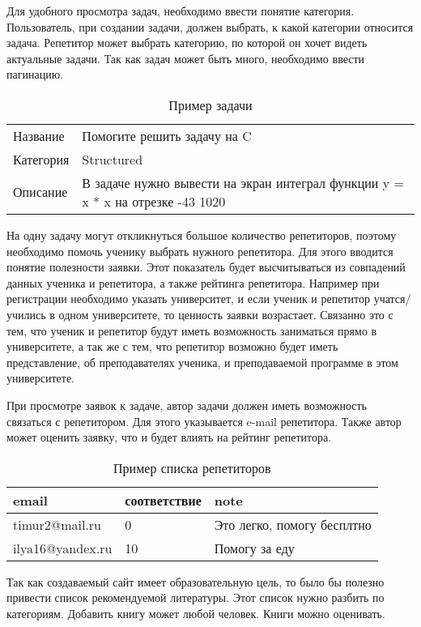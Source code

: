 Для удобного просмотра задач, необходимо ввести понятие категория. Пользователь, при создании задачи, должен выбрать, к какой категории относится задача.  Репетитор может выбрать категорию, по которой он хочет видеть актуальные задачи. Так как задач может быть много, необходимо ввести пагинацию.

\begin{table}[h]
\caption{Пример задачи}
\medskip
\begin{tabular}{|l|p{12cm}|}
\hline
Название & Помогите решить задачу на C  \\
Категория & Structured \\ 
Описание & В задаче нужно вывести на экран интеграл функции y = x * x на отрезке -43 1020 \\
\hline
\end{tabular}
\end{table}

На одну задачу могут откликнуться большое количество репетиторов, поэтому необходимо помочь ученику выбрать нужного репетитора. Для этого вводится понятие полезности заявки. Этот показатель будет высчитываться из совпадений данных ученика и репетитора, а также рейтинга репетитора. Например при регистрации необходимо указать университет, и если ученик и репетитор учатся/учились в одном университете, то ценность заявки возрастает. Связанно это с тем, что ученик и репетитор будут иметь возможность заниматься прямо в университете, а так же с тем, что репетитор возможно будет иметь представление, об преподавателях ученика, и преподаваемой программе в этом университете.

При просмотре заявок к задаче, автор задачи должен иметь возможность связаться с репетитором. Для этого указывается e-mail репетитора. Также автор может оценить заявку, что и будет влиять на рейтинг репетитора.

\begin{table}[h]
\caption{Пример списка репетиторов}
\medskip
\begin{tabular}{|l|l|p{8cm}|}
\hline
email & соответствие & note\\
\hline
timur2@mail.ru & 0 & Это легко, помогу бесплтно\\
ilya16@yandex.ru & 10 & Помогу за еду\\
\hline
\end{tabular}
\end{table}

Так как создаваемый сайт имеет образовательную цель, то было бы полезно привести список рекомендуемой литературы. Этот список нужно разбить по категориям. Добавить книгу может любой человек. Книги можно оценивать.

